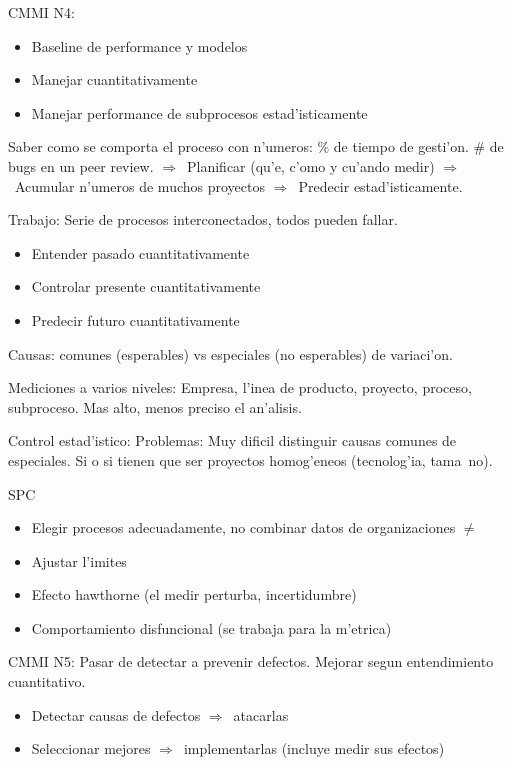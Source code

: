 \documentclass[a4paper,spanish]{article}
\newcommand{\then}[0]{\ensuremath{\Rightarrow}~}
\newenvironment{items}{
		\vspace*{-\topsep}
		\begin{itemize} 
		\addtolength{\itemsep}{-0.5\baselineskip}
		}{\end{itemize}\vspace*{-\topsep}}
\begin{document}
CMMI N4:
\begin{items}
\item Baseline de performance y modelos
\item Manejar cuantitativamente
\item Manejar performance de subprocesos estad'isticamente
\end{items}

Saber como se comporta el proceso con n'umeros: \% de tiempo de gesti'on. \# de
	bugs en un peer review. \then Planificar (qu'e, c'omo y cu'ando medir)
	\then Acumular n'umeros de muchos proyectos \then Predecir 
	estad'isticamente.

Trabajo: Serie de procesos interconectados, todos pueden fallar.
\begin{items}
\item Entender pasado cuantitativamente
\item Controlar presente cuantitativamente
\item Predecir futuro cuantitativamente
\end{items}

Causas: comunes (esperables) vs especiales (no esperables) de variaci'on.

Mediciones a varios niveles: Empresa, l'inea de producto, proyecto, proceso,
	subproceso. Mas alto, menos preciso el an'alisis.
	
Control estad'istico: Problemas: Muy dificil distinguir causas comunes de 
	especiales. Si o si tienen que ser proyectos homog'eneos (tecnolog'ia,
	tama~no).
	
SPC
\begin{items}
\item Elegir procesos adecuadamente, no combinar datos de organizaciones $\neq$
\item Ajustar l'imites
\item Efecto hawthorne (el medir perturba, incertidumbre)
\item Comportamiento disfuncional (se trabaja para la m'etrica)
\end{items}

CMMI N5: Pasar de detectar a prevenir defectos. Mejorar segun entendimiento
	cuantitativo.
\begin{items}
\item Detectar causas de defectos \then atacarlas
\item Seleccionar mejores \then implementarlas (incluye medir sus efectos)
\end{items}
\end{document}
